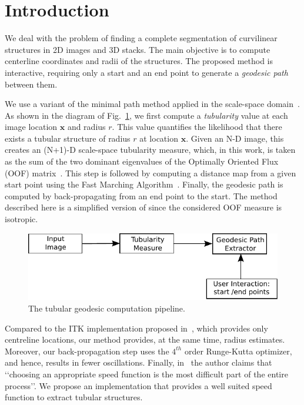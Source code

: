 \documentclass{InsightArticle}
\begin{document}
\section{Introduction}

We deal with the problem of finding a complete segmentation of curvilinear structures in 2D images and 3D stacks. The main objective is to compute centerline coordinates and radii of the structures. The proposed method is interactive, requiring only a start and an end point to generate a \textit{geodesic path} between them.

We use  a variant of the  minimal path method   applied  in   the   scale-space   domain~\cite{Li07}. 
As shown in the diagram of Fig.~\ref{fig:diagram}, we first compute a \textit{tubularity} value at each image location $\mathbf{x}$ and radius $r$. This value quantifies the likelihood that there exists a tubular structure of radius $r$ at location $\mathbf{x}$. Given an N-D image, this creates an (N+1)-D scale-space tubularity measure, which, in this work, is taken as the sum of the two dominant eigenvalues of the Optimally Oriented Flux (OOF) matrix~\cite{Law08}. This step is followed by computing a distance map from a given start point using the Fast Marching Algorithm~\cite{Sethian99}. Finally, the geodesic path is computed by back-propagating from an end point to the start. The method described here is a simplified version of \cite{Benmansour11} since the considered OOF measure is isotropic.

\begin{figure}[!h]
\begin{center}		
\includegraphics[width=0.5\linewidth]{Diagram}
\end{center}
\caption{The tubular geodesic computation pipeline.}
\label{fig:diagram}
\end{figure}

Compared to the ITK implementation proposed in~\cite{Mueller2008}, which provides only centreline locations, our method provides, at the same time, radius estimates. Moreover, our back-propagation step uses the $4^{th}$ order Runge-Kutta optimizer, and hence, results in fewer oscillations. Finally, in~\cite{Mueller2008} the author claims that \lq\lq choosing an appropriate speed function is the most difficult part of the entire process\rq\rq. We propose an implementation that provides a well suited speed function to extract tubular structures.
\end{document}
